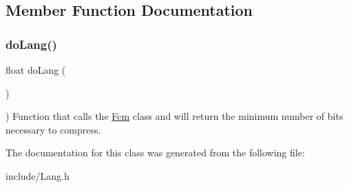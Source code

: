 \subsection{Member Function Documentation}
\mbox{\label{classLang_a5961c05cbe83f588163f17367a4a99bc}} 
\subsubsection{\texorpdfstring{do\+Lang()}{doLang()}}
{\footnotesize\ttfamily float do\+Lang (\begin{DoxyParamCaption}{ }\end{DoxyParamCaption})\hspace{0.3cm}{\ttfamily [inline]}}

) Function that calls the \hyperlink{classFcm}{Fcm} class and will return the minimum number of bits necessary to compress.

The documentation for this class was generated from the following file\+:\begin{DoxyCompactItemize}
\item 
include/Lang.\+h\end{DoxyCompactItemize}
